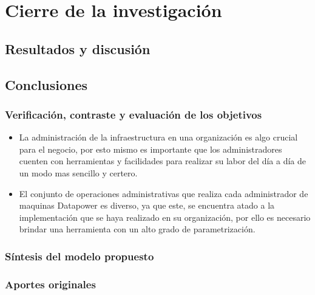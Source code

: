 \chapter{Cierre de la investigación}
\section{Resultados y discusión}
\section{Conclusiones}
\subsection{Verificación, contraste y evaluación de los objetivos}
\begin{itemize}
    \item La administración de la infraestructura en una organización es algo crucial para el negocio, por esto mismo es importante que los administradores cuenten con herramientas y facilidades para realizar su labor del día a día de un modo mas sencillo y certero.
    \item El conjunto de operaciones administrativas que realiza cada administrador de maquinas Datapower es diverso, ya que este, se encuentra atado a la implementación que se haya realizado en su organización, por ello es necesario brindar una herramienta con un alto grado de parametrización.
\end{itemize}
\subsection{Síntesis del modelo propuesto}
\subsection{Aportes originales}
